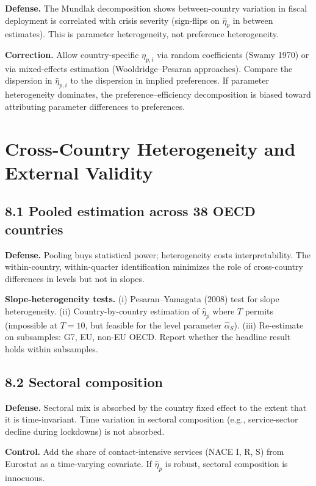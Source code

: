 \documentclass[11pt,a4paper]{article}
\begin{document}
\textbf{Defense.} The Mundlak decomposition shows between-country variation in fiscal deployment is correlated with crisis severity (sign-flips on $\hat\eta_p$ in between estimates). This is parameter heterogeneity, not preference heterogeneity.

\textbf{Correction.} Allow country-specific $\eta_{p,i}$ via random coefficients (Swamy 1970) or via mixed-effects estimation (Wooldridge--Pesaran approaches). Compare the dispersion in $\hat\eta_{p,i}$ to the dispersion in implied preferences. If parameter heterogeneity dominates, the preference--efficiency decomposition is biased toward attributing parameter differences to preferences.

\section{Cross-Country Heterogeneity and External Validity}

\subsection*{8.1 Pooled estimation across 38 OECD countries}

\textbf{Defense.} Pooling buys statistical power; heterogeneity costs interpretability. The within-country, within-quarter identification minimizes the role of cross-country differences in levels but not in slopes.

\textbf{Slope-heterogeneity tests.} (i) Pesaran--Yamagata (2008) test for slope heterogeneity. (ii) Country-by-country estimation of $\hat\eta_p$ where $T$ permits (impossible at $T=10$, but feasible for the level parameter $\hat\alpha_S$). (iii) Re-estimate on subsamples: G7, EU, non-EU OECD. Report whether the headline result holds within subsamples.

\subsection*{8.2 Sectoral composition}

\textbf{Defense.} Sectoral mix is absorbed by the country fixed effect to the extent that it is time-invariant. Time variation in sectoral composition (e.g., service-sector decline during lockdowns) is not absorbed.

\textbf{Control.} Add the share of contact-intensive services (NACE I, R, S) from Eurostat as a time-varying covariate. If $\hat\eta_p$ is robust, sectoral composition is innocuous.
\end{document}
